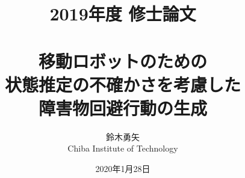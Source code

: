 \documentclass[a4paper,12pt,uplatex]{jsbook}
\begin{document}
\title{2019年度 修士論文\\
　\\
移動ロボットのための\\
状態推定の不確かさを考慮した\\
障害物回避行動の生成}
\author{鈴木勇矢\\
Chiba Institute of Technology}
\date{2020年1月28日}

\maketitle


\tableofcontents

\cleardoublepage
{}








% 
% 
% 
% 
% 
% 




\newpage
\end{document}
